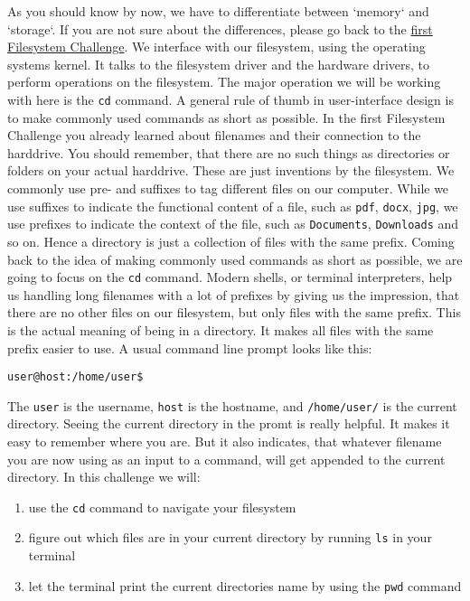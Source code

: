 \begin{challenge}
    \begin{chadescription}
    As you should know by now, we have to differentiate between `memory` and `storage`.
    If you are not sure about the differences, please go back to the \href{https://www.github.com/STEMgraph/}{first Filesystem Challenge}.
    We interface with our filesystem, using the operating systems kernel. 
    It talks to the filesystem driver and the hardware drivers, to perform operations on the filesystem.
    The major operation we will be working with here is the \texttt{cd} command.
    A general rule of thumb in user-interface design is to make commonly used commands as short as possible.
    In the first Filesystem Challenge you already learned about filenames and their connection to the harddrive. 
    You should remember, that there are no such things as directories or folders on your actual harddrive.
    These are just inventions by the filesystem. 
    We commonly use pre- and suffixes to tag different files on our computer. 
    While we use suffixes to indicate the functional content of a file, such as \texttt{pdf}, \texttt{docx}, \texttt{jpg}, we use prefixes to indicate the context of the file, such as \texttt{Documents}, \texttt{Downloads} and so on.
    Hence a directory is just a collection of files with the same prefix.
    Coming back to the idea of making commonly used commands as short as possible, we are going to focus on the \texttt{cd} command.
    Modern shells, or terminal interpreters, help us handling long filenames with a lot of prefixes by giving us the impression, that there are no other files on our filesystem, but only files with the same prefix.
    This is the actual meaning of being in a directory.
    It makes all files with the same prefix easier to use. 
    A usual command line prompt looks like this:
    \begin{center}
    \texttt{user@host:/home/user\$}
    \end{center}
    The \texttt{user} is the username, \texttt{host} is the hostname, and \texttt{/home/user/} is the current directory.
    Seeing the current directory in the promt is really helpful. 
    It makes it easy to remember where you are.
    But it also indicates, that whatever filename you are now using as an input to a command, will get appended to the current directory.
    In this challenge we will: 
    
    
    \begin{enumerate}
        \item use the \texttt{cd} command to navigate your filesystem
        \item figure out which files are in your current directory by running \texttt{ls} in your terminal
        \item let the terminal print the current directories name by using the \texttt{pwd} command
    \end{enumerate}
    \end{chadescription}


\end{challenge}
